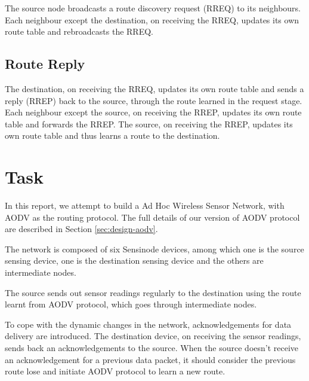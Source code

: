 The source node broadcasts a route discovery request (RREQ) to its neighbours.
Each neighbour except the destination, on receiving the RREQ, updates its own route table and rebroadcasts the RREQ.

\subsection{Route Reply}

The destination, on receiving the RREQ, updates its own route table and sends a reply (RREP) back to the source, through the route learned in the request stage.
Each neighbour except the source, on receiving the RREP, updates its own route table and forwards the RREP.
The source, on receiving the RREP, updates its own route table and thus learns a route to the destination.

\section{Task}

In this report, we attempt to build a Ad Hoc Wireless Sensor Network, with AODV as the routing protocol.
The full details of our version of AODV protocol are described in Section \ref{sec:design-aodv}.

The network is composed of six Sensinode devices, among which one is the source sensing device, one is the destination sensing device and the others are intermediate nodes.

The source sends out sensor readings regularly to the destination using the route learnt from AODV protocol, which goes through intermediate nodes.

To cope with the dynamic changes in the network, acknowledgements for data delivery are introduced.
The destination device, on receiving the sensor readings, sends back an acknowledgements to the source.
When the source doesn't receive an acknowledgement for a previous data packet, it should consider the previous route lose and initiate AODV protocol to learn a new route.


